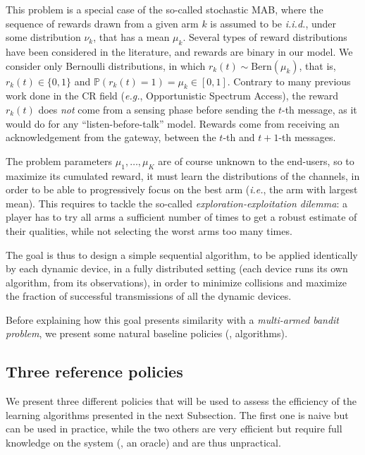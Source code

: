 This problem is a special case of the so-called stochastic MAB, where the sequence of rewards drawn from a given arm $k$ is assumed to be  \emph{i.i.d.}, under some distribution $\nu_k$, that has a mean $\mu_k$.
Several types of reward distributions have been considered in the literature, and rewards are binary in our model.
We consider only Bernoulli distributions, in which $r_k(t) \sim \mathrm{Bern}(\mu_k)$, that is, $r_k(t) \in \{0,1\}$ and $\mathbb{P}(r_k(t) = 1) = \mu_k \in [0,1]$.
Contrary to many previous work done in the CR field (\emph{e.g.}, Opportunistic Spectrum Access),
the reward $r_k(t)$ does \emph{not} come from a sensing phase before sending the $t$-th message, as it would do for any ``listen-before-talk'' model.
Rewards come from receiving an acknowledgement from the gateway, between the $t$-th and $t+1$-th messages.

The problem parameters $\mu_1,\dots,\mu_K$ are of course unknown to the end-users, so to maximize its cumulated reward, it must learn the distributions of the channels, in order to be able to progressively focus on the best arm (\emph{i.e.}, the arm with largest mean).
%
This requires to tackle the so-called \emph{exploration-exploitation dilemma}: a player has to try all arms a sufficient number of times to get a robust estimate of their qualities, while not selecting the worst arms too many times.

The goal is thus to design a simple sequential algorithm, to be applied identically by each dynamic device, in a fully distributed setting (each device runs its own algorithm, from its observations), in order to minimize collisions and maximize the fraction of successful transmissions of all the dynamic devices.

Before explaining how this goal presents similarity with a \emph{multi-armed bandit problem}, we present some natural baseline policies (\ie, algorithms).


\subsection{Three reference policies}\label{sub:41:threeReferencePolicies}

We present three different policies that will be used to assess the efficiency of the learning algorithms presented in the next Subsection.
The first one is naive but can be used in practice, while the two others are very efficient but require full knowledge on the system (\ie, an oracle) and are thus unpractical.


